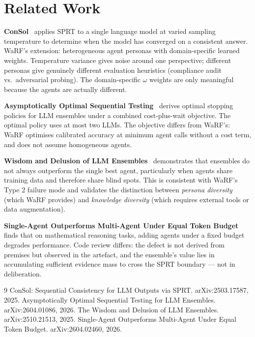 \documentclass[11pt,a4paper]{article}
\begin{document}
\section{Related Work}

\textbf{ConSol}~\cite{consol2025} applies SPRT to a single language model at
varied sampling temperature to determine when the model has converged on a
consistent answer. WaRF's extension: heterogeneous agent personas with
domain-specific learned weights. Temperature variance gives noise around one
perspective; different personas give genuinely different evaluation heuristics
(compliance audit vs.\ adversarial probing). The domain-specific $\omega$
weights are only meaningful because the agents are actually different.

\textbf{Asymptotically Optimal Sequential Testing}~\cite{optimal2026} derives
optimal stopping policies for LLM ensembles under a combined cost-plus-wait
objective. The optimal policy uses at most two LLMs. The objective differs
from WaRF's: WaRF optimises calibrated accuracy at minimum agent calls without
a cost term, and does not assume homogeneous agents.

\textbf{Wisdom and Delusion of LLM Ensembles}~\cite{wisdom2025} demonstrates
that ensembles do not always outperform the single best agent, particularly
when agents share training data and therefore share blind spots. This is
consistent with WaRF's Type 2 failure mode and validates the distinction
between \emph{persona diversity} (which WaRF provides) and
\emph{knowledge diversity} (which requires external tools or data augmentation).

\textbf{Single-Agent Outperforms Multi-Agent Under Equal Token Budget}~\cite{single2026}
finds that on mathematical reasoning tasks, adding agents under a fixed budget
degrades performance. Code review differs: the defect is not derived from
premises but observed in the artefact, and the ensemble's value lies in
accumulating sufficient evidence mass to cross the SPRT boundary — not in
deliberation.

\begin{thebibliography}{9}
  ConSol: Sequential Consistency for LLM Outputs via SPRT.
  arXiv:2503.17587, 2025.
  Asymptotically Optimal Sequential Testing for LLM Ensembles.
  arXiv:2604.01086, 2026.
  The Wisdom and Delusion of LLM Ensembles.
  arXiv:2510.21513, 2025.
  Single-Agent Outperforms Multi-Agent Under Equal Token Budget.
  arXiv:2604.02460, 2026.
\end{thebibliography}
\end{document}
